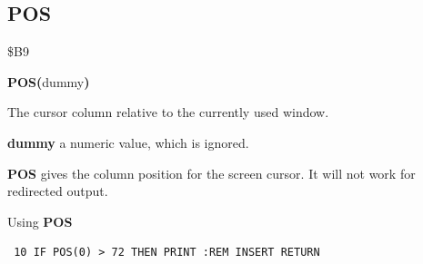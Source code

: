 
\newpage
\subsection{POS}
\begin{description}[leftmargin=2cm,style=nextline]
\item [Token:] \$B9
\item [Format:] {\bf POS(}dummy{\bf)}
\item [Returns:]  The cursor column relative to the
                currently used window.

                {\bf dummy} a numeric value, which is ignored.

\item [Remarks:] {\bf POS} gives the column position for the screen
                 cursor. It will not work for redirected output.

\item [Example:] Using {\bf POS}

\begin{tcolorbox}[colback=black,coltext=white]
\verbatimfont{\codefont}
\begin{verbatim}
 10 IF POS(0) > 72 THEN PRINT :REM INSERT RETURN
\end{verbatim}
\end{tcolorbox}
\end{description}


\newpage

